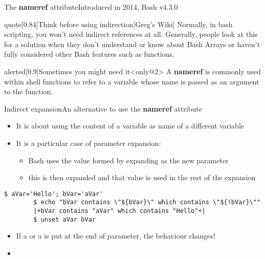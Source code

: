 \begin{frame}[fragile]{The \textbf{nameref} attribute}{Introduced in 2014, Bash v4.3.0}
\begin{varblock}{quote}[0.84\textwidth]{Think before using indirection}[Greg's Wiki]
        \smallskip
        Normally, in bash scripting, you won't need indirect references at all.
        Generally, people look at this for a solution when they don't understand or know about Bash Arrays or haven't fully considered other Bash features such as functions.
        \smallskip
    \end{varblock}
    \begin{varblock}{alerted}[0.9\textwidth]{Sometimes you might need it}<only@2>
        A \textbf{nameref} is commonly used within shell functions to refer to a variable whose name is passed as an argument to the function.
    \end{varblock}
\end{frame}
\begin{frame}[fragile]{Indirect expansion}{An alternative to use the \textbf{nameref} attribute}
    \vspace{-3mm}
    \begin{itemize}
        \item It is about using the content of a variable as name of a different variable
        \item It is a particular case of parameter expansion: 
              \begin{itemize}
                  \item Bash uses the value formed by expanding  as the new parameter
                  \item this is then expanded and that value is used in the rest of the expansion
              \end{itemize}
    \end{itemize}
    \begin{lstlisting}[style=MyBash, xrightmargin=1mm, belowskip=-4mm]
        $ aVar='Hello'; bVar='aVar'
        $ echo "bVar contains \"${bVar}\" which contains \"${!bVar}\""
        |+bVar contains "aVar" which contains "Hello"+|
        $ unset aVar bVar
    \end{lstlisting}
    \vspace{2mm}
    \begin{itemize}[<2->]
        \item If a \PB{\texttt{*}} or a  is put at the end of parameter, the behaviour changes!\\[0.3em]
        \small\setlength{\itemsep}{0mm}
        \item[] 

\end{itemize}
\end{frame}

